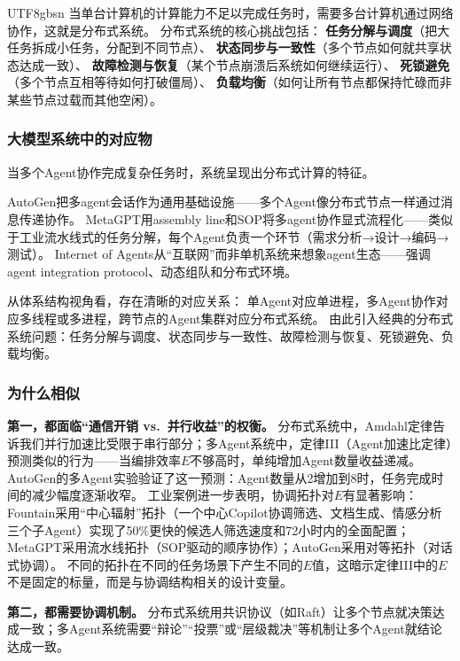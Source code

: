 \documentclass[11pt,a4paper]{article}
\begin{document}
\begin{CJK*}{UTF8}{gbsn}
当单台计算机的计算能力不足以完成任务时，需要多台计算机通过网络协作，这就是分布式系统。
分布式系统的核心挑战包括：
\textbf{任务分解与调度}（把大任务拆成小任务，分配到不同节点）、
\textbf{状态同步与一致性}（多个节点如何就共享状态达成一致）、
\textbf{故障检测与恢复}（某个节点崩溃后系统如何继续运行）、
\textbf{死锁避免}（多个节点互相等待如何打破僵局）、
\textbf{负载均衡}（如何让所有节点都保持忙碌而非某些节点过载而其他空闲）\cite{hennessy2017quantitative}。

\subsubsection{大模型系统中的对应物}

当多个Agent协作完成复杂任务时，系统呈现出分布式计算的特征。

AutoGen把多agent会话作为通用基础设施\cite{wu2023autogen}——多个Agent像分布式节点一样通过消息传递协作。
MetaGPT用assembly line和SOP将多agent协作显式流程化\cite{metagpt2023}——类似于工业流水线式的任务分解，每个Agent负责一个环节（需求分析→设计→编码→测试）。
Internet of Agents从``互联网''而非单机系统来想象agent生态\cite{ioa2024}——强调agent integration protocol、动态组队和分布式环境。

从体系结构视角看，存在清晰的对应关系：
单Agent对应单进程，多Agent协作对应多线程或多进程，跨节点的Agent集群对应分布式系统。
由此引入经典的分布式系统问题：任务分解与调度、状态同步与一致性、故障检测与恢复、死锁避免、负载均衡。

\subsubsection{为什么相似}

\textbf{第一，都面临``通信开销 vs.\ 并行收益''的权衡。}
分布式系统中，Amdahl定律告诉我们并行加速比受限于串行部分；多Agent系统中，定律III（Agent加速比定律）预测类似的行为——当编排效率$E$不够高时，单纯增加Agent数量收益递减。
AutoGen的多Agent实验验证了这一预测：Agent数量从2增加到8时，任务完成时间的减少幅度逐渐收窄\cite{wu2023autogen}。
工业案例进一步表明，协调拓扑对$E$有显著影响：Fountain采用``中心辐射''拓扑（一个中心Copilot协调筛选、文档生成、情感分析三个子Agent）实现了50\%更快的候选人筛选速度和72小时内的全面配置\cite{anthropic2026agenticreport}；MetaGPT采用流水线拓扑（SOP驱动的顺序协作）；AutoGen采用对等拓扑（对话式协调）。
不同的拓扑在不同的任务场景下产生不同的$E$值，这暗示定律III中的$E$不是固定的标量，而是与协调结构相关的设计变量。

\textbf{第二，都需要协调机制。}
分布式系统用共识协议（如Raft\cite{raft2014}）让多个节点就决策达成一致；多Agent系统需要``辩论''``投票''或``层级裁决''等机制让多个Agent就结论达成一致。


\end{CJK*}
\end{document}
